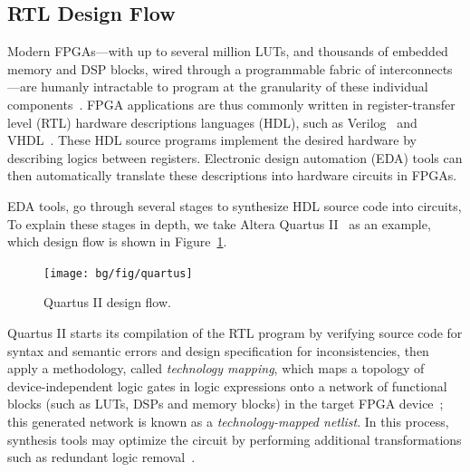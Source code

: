 \subsection{RTL Design Flow}
\label{bg:sub:rtl_design}

Modern FPGAs---with up to several million LUTs, and thousands of
embedded memory and DSP blocks, wired through a programmable fabric of
interconnects---are humanly intractable to program at the granularity of these
individual components~\cite{kapre08}.  FPGA applications are thus commonly
written in register-transfer level (RTL) hardware descriptions languages
(HDL), such as Verilog~\cite{verilog} and VHDL~\cite{vhdl}.  These HDL source
programs implement the desired hardware by describing logics between registers.
Electronic design automation (EDA) tools can then automatically translate these
descriptions into hardware circuits in FPGAs.

EDA tools, go through several stages to synthesize HDL source code
into circuits, To explain these stages in depth, we take Altera
Quartus II~\cite{quartus} as an example, which design flow is shown in
Figure~\ref{fig:quartus}.
\begin{figure}[ht]
    \centering
    \texttt{[image: bg/fig/quartus]}
    \caption{Quartus II design flow.}\label{fig:quartus}
\end{figure}

Quartus II starts its compilation of the RTL program by verifying source code
for syntax and semantic errors and design specification for inconsistencies,
then apply a methodology, called \emph{technology mapping}, which maps a
topology of device-independent logic gates in logic expressions onto a
network of functional blocks (such as LUTs, DSPs and memory blocks) in
the target FPGA device~\cite{cong08}; this generated network is known as
a \emph{technology-mapped netlist}.  In this process, synthesis tools may
optimize the circuit by performing additional transformations such as redundant
logic removal~\cite{quartus}.

